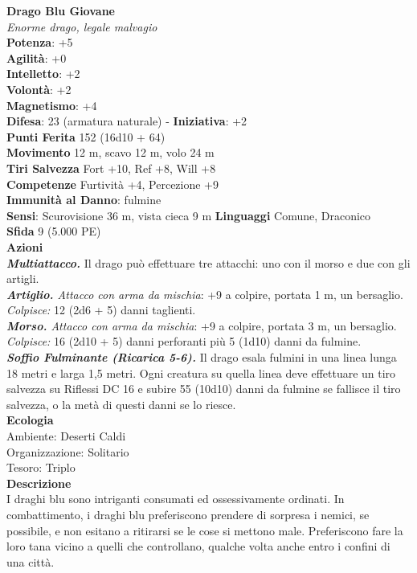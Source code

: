 \begin{multicols}{2}
\medskip\textbf{Drago Blu Giovane}\\
\emph{Enorme drago, legale malvagio}\\
\textbf{Potenza}: +5\\
\textbf{Agilità}: +0\\
\textbf{Intelletto}: +2\\
\textbf{Volontà}: +2\\
\textbf{Magnetismo}: +4\\
\textbf{Difesa}: 23 (armatura naturale) - \textbf{Iniziativa}: +2\\
\textbf{Punti Ferita} 152 (16d10 + 64)\\
\textbf{Movimento} 12 m, scavo 12 m, volo 24 m\\
\textbf{Tiri Salvezza} Fort +10, Ref +8, Will +8\\
\textbf{Competenze} Furtività +4, Percezione +9\\
\textbf{Immunità al Danno}: fulmine\\
\textbf{Sensi}: Scurovisione 36 m, vista cieca 9 m
\textbf{Linguaggi} Comune, Draconico\\
\textbf{Sfida} 9 (5.000 PE)\smallskip\\
\smallskip\textbf{Azioni}\\
\emph{\textbf{Multiattacco.}} Il drago può effettuare tre attacchi: uno con il morso e due con gli artigli.\\
\emph{\textbf{Artiglio.} Attacco con arma da mischia}: +9 a colpire, portata 1 m, un bersaglio.\\
\emph{Colpisce:} 12 (2d6 + 5) danni taglienti.\\
\emph{\textbf{Morso.} Attacco con arma da mischia}: +9 a colpire, portata 3 m, un bersaglio.\\
\emph{Colpisce:} 16 (2d10 + 5) danni perforanti più 5 (1d10) danni da fulmine.\\
\emph{\textbf{Soffio Fulminante (Ricarica 5-6).}} Il drago esala fulmini in una linea lunga 18 metri e larga 1,5 metri. Ogni creatura su quella linea deve effettuare un tiro salvezza su Riflessi DC 16 e subire 55 (10d10) danni da fulmine se fallisce il tiro salvezza, o la metà di questi danni se lo riesce.\\
\textbf{Ecologia}\\
Ambiente: Deserti Caldi\\
Organizzazione: Solitario\\
Tesoro: Triplo\\
\textbf{Descrizione}\\
I draghi blu sono intriganti consumati ed ossessivamente ordinati. In combattimento, i draghi blu preferiscono prendere di sorpresa i nemici, se possibile, e non esitano a ritirarsi se le cose si mettono male. Preferiscono fare la loro tana vicino a quelli che controllano, qualche volta anche entro i confini di una città.\\



\end{multicols}
